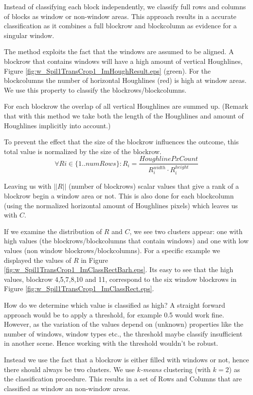 Instead of classifying each block independently, we classify full rows and
columns of blocks as window or non-window areas.  This approach results in a accurate
classification as it combines a full blockrow and blockcolumn as evidence for a singular
window. 

The method exploits the fact that the windows are assumed to be
aligned.
A blockrow that contains windows will have a high amount of vertical
Houghlines, Figure \ref{fig:w_Spil1TransCrop1_ImHoughResult.eps}
(green). For the blockcolumns the number of horizontal Houghlines
 (red) is high at window areas.  We use this property to classify 
 the blockrows/blockcolumns. 

For each blockrow the overlap of all vertical Houghlines are summed up.
(Remark that with this method we take both the length of the Houghlines and
amount of Houghlines implicitly into account.)

To prevent the effect that the size of the blockrow influences the outcome, this total value
is normalized by the size of the blockrow.
\[\forall Ri\in \{1..numRows\} : R_i = \frac{HoughlinePxCount}{R_i^{width} \cdot R_i^{height}}\]

Leaving us with $||R||$ (number of blockrows) scalar values that give a rank of a blockrow begin a window area or not.
This is also done for each blockcolumn (using the normalized horizontal amount of
Houghlines pixels) which leaves us with $C$.

If we examine the distribution of $R$ and $C$, we see two clusters appear: one with
high values (the blockrows/blockcolumns that contain windows) and one with low values (non window
blockrows/blockcolumns). For a specific example we displayed the values of $R$ in Figure \ref{fig:w_Spil1TransCrop1_ImClassRectBarh.eps}.
Its easy to see that the high values, blockrow 4,5,7,8,10 and 11, correspond to the
six window blockrows in Figure \ref{fig:w_Spil1TransCrop1_ImClassRect.eps}.

How do we determine which value is classified as high?  A straight forward
approach would be to apply a threshold, for example 0.5 would work fine.
However, as the variation of the values depend on (unknown) properties like the
number of windows, window types etc., the threshold maybe classify insufficient
in another scene.  Hence working with the threshold wouldn't be robust. 

Instead we use the fact that a blockrow is either filled with windows or not, hence
there should always be two clusters.  We use \emph{$k$-means} clustering (with
$k=2$) as the classification procedure.
This results in a set of Rows and Columns that are classified as window an
non-window areas.

